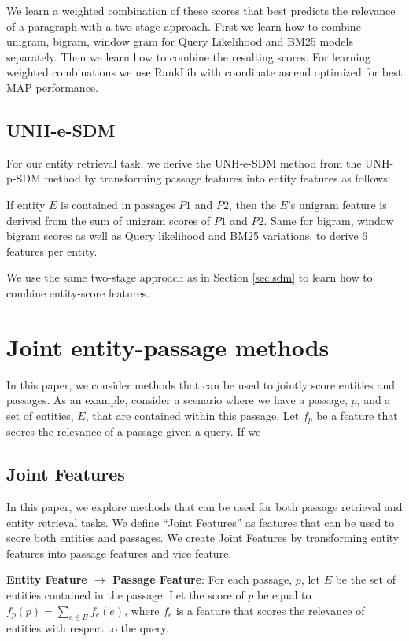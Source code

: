 \documentclass{article}
\begin{document}
We learn a weighted combination of these scores that best predicts the relevance of a paragraph with a two-stage approach. First we learn how to combine unigram, bigram, window gram for Query Likelihood and BM25 models separately. Then we learn how to combine the resulting scores. For learning weighted combinations we use RankLib with coordinate ascend optimized for best MAP performance.


\subsection{UNH-e-SDM}

For our entity retrieval task, we derive the UNH-e-SDM method from the UNH-p-SDM method by transforming passage features into entity features as follows:

If entity $E$ is contained in passages $P1$ and $P2$, then the $E$'s unigram feature is derived from the sum of unigram scores of $P1$ and $P2$. Same for bigram, window bigram scores as well as Query likelihood and BM25 variations, to derive 6 features per entity.

We use the same two-stage approach as in Section \ref{sec:sdm} to learn how to combine entity-score features.



\section{Joint entity-passage methods}

In this paper, we consider methods that can be used to jointly score entities and passages.
As an example, consider a scenario where we have a passage, $p$, and a set of entities, $E$, that are contained within this passage. Let $f_p$ be a feature that scores the relevance of a passage given a query. If we

\subsection{Joint Features}\label{sec:joint}
In this paper, we explore methods that can be used for both passage retrieval and entity retrieval tasks.
We define ``Joint Features'' as features that can be used to score both entities and passages.
We create Joint Features by transforming entity features into passage features and vice feature.

\textbf{Entity Feature $\rightarrow$ Passage Feature}: For each passage, $p$, let $E$ be the set of entities contained in the passage. Let the score of $p$ be equal to $f_p(p) = \sum_{e \in E}{f_e(e)}$, where $f_e$ is a feature that scores the relevance of entities with respect to the query.
\end{document}
